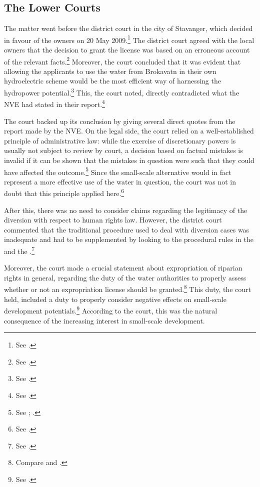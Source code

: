 \subsection{The Lower Courts}\label{sec:5:6:3}

The matter went before the district court in the city of Stavanger, which decided in favour of the owners on 20 May 2009.\footnote{See \cite{jorpeland09}.} The district court agreed with the local  owners that the decision to grant the license was based on an erroneous account of the relevant facts.\footnote{See \cite[25]{jorpeland11}.} Moreover, the court concluded that it was evident that allowing the applicants to use the water from Brokavatn in their own hydroelectric scheme would be the most efficient way of harnessing the hydropower potential.\footnote{See \cite[22-23]{jorpeland09}.} This, the court noted, directly contradicted what the NVE had stated in their report.\footnote{See \cite[23]{jorpeland09}.}

The court backed up its conclusion by giving several direct quotes from the report made by the NVE. On the legal side, the court relied on a well-established principle of administrative law: while the exercise of discretionary powers is usually not subject to review by court, a decision based on factual mistakes is invalid if it can be shown that the mistakes in question were such that they could have affected the outcome.\footnote{See \dni\cite[41]{paa67}; \cite[407-410]{eckhoff14}.} Since the small-scale alternative would in fact represent a more effective use of the water in question, the court was not in doubt that this principle applied here.\footnote{See \cite[25]{jorpeland09}.}

After this, there was no need to consider claims regarding the legitimacy of the diversion with respect to human rights law. However, the district court commented that the traditional procedure used to deal with diversion cases was inadequate and had to be supplemented by looking to the procedural rules in the \cite{ea59} and the \cite{paa67}.\footnote{See \cite[21]{jorpeland09}.}

Moreover, the court made a crucial statement about expropriation of riparian rights in general, regarding the duty of the water authorities to properly assess whether or not an expropriation license should be granted.\footnote{Compare \dni\cite[12]{ea59} and \dni\cite[16]{paa67}.} This duty, the court held, included a duty to properly consider negative effects on small-scale development potentials.\footnote{See \cite[22]{jorpeland09}.} According to the court, this was the natural consequence of the increasing interest in small-scale development. 

